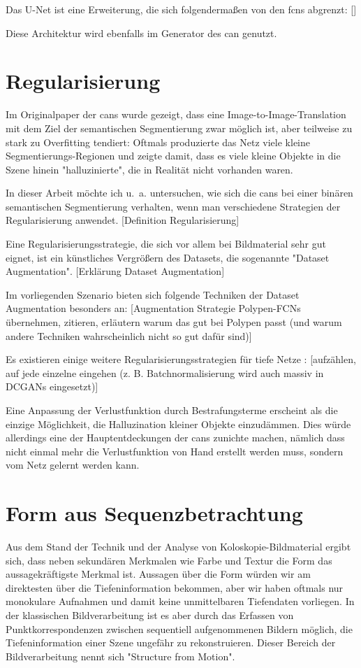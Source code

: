 Das U-Net ist eine Erweiterung, die sich folgendermaßen von den \glspl{fcn} abgrenzt:
[]

Diese Architektur wird ebenfalls im Generator des \gls{can} genutzt.

\section{Regularisierung}

Im Originalpaper der \glspl{can} wurde gezeigt, dass eine Image-to-Image-Translation mit dem Ziel der semantischen Segmentierung zwar möglich ist, aber teilweise zu stark zu Overfitting tendiert:
Oftmals produzierte das Netz viele kleine Segmentierungs-Regionen und zeigte damit, dass es viele kleine Objekte in die Szene hinein "halluzinierte", die in Realität nicht vorhanden waren.

In dieser Arbeit möchte ich u.~a. untersuchen, wie sich die \glspl{can} bei einer binären semantischen Segmentierung verhalten, wenn man verschiedene Strategien der Regularisierung anwendet.
[Definition Regularisierung]

Eine Regularisierungsstrategie, die sich vor allem bei Bildmaterial sehr gut eignet, ist ein künstliches Vergrößern des Datasets, die sogenannte "Dataset Augmentation".
[Erklärung Dataset Augmentation]

Im vorliegenden Szenario bieten sich folgende Techniken der Dataset Augmentation besonders an:
[Augmentation Strategie Polypen-FCNs übernehmen, zitieren, erläutern warum das gut bei Polypen passt (und warum andere Techniken wahrscheinlich nicht so gut dafür sind)]

Es existieren einige weitere Regularisierungsstrategien für tiefe Netze \cite{Goodfellow.2016}:
[aufzählen, auf jede einzelne eingehen (z. B. Batchnormalisierung wird auch massiv in DCGANs eingesetzt)]

Eine Anpassung der Verlustfunktion durch Bestrafungsterme erscheint als die einzige Möglichkeit, die Halluzination kleiner Objekte einzudämmen.
Dies würde allerdings eine der Hauptentdeckungen der \glspl{can} zunichte machen, nämlich dass nicht einmal mehr die Verlustfunktion von Hand erstellt werden muss, sondern vom Netz gelernt werden kann.

\section{Form aus Sequenzbetrachtung}

Aus dem Stand der Technik und der Analyse von Koloskopie-Bildmaterial ergibt sich, dass neben sekundären Merkmalen wie Farbe und Textur die Form das aussagekräftigste Merkmal ist.
Aussagen über die Form würden wir am direktesten über die Tiefeninformation bekommen, aber wir haben oftmals nur monokulare Aufnahmen und damit keine unmittelbaren Tiefendaten vorliegen.
In der klassischen Bildverarbeitung ist es aber durch das Erfassen von Punktkorrespondenzen zwischen sequentiell aufgenommenen Bildern möglich, die Tiefeninformation einer Szene ungefähr zu rekonstruieren.
Dieser Bereich der Bildverarbeitung nennt sich "Structure from Motion".

